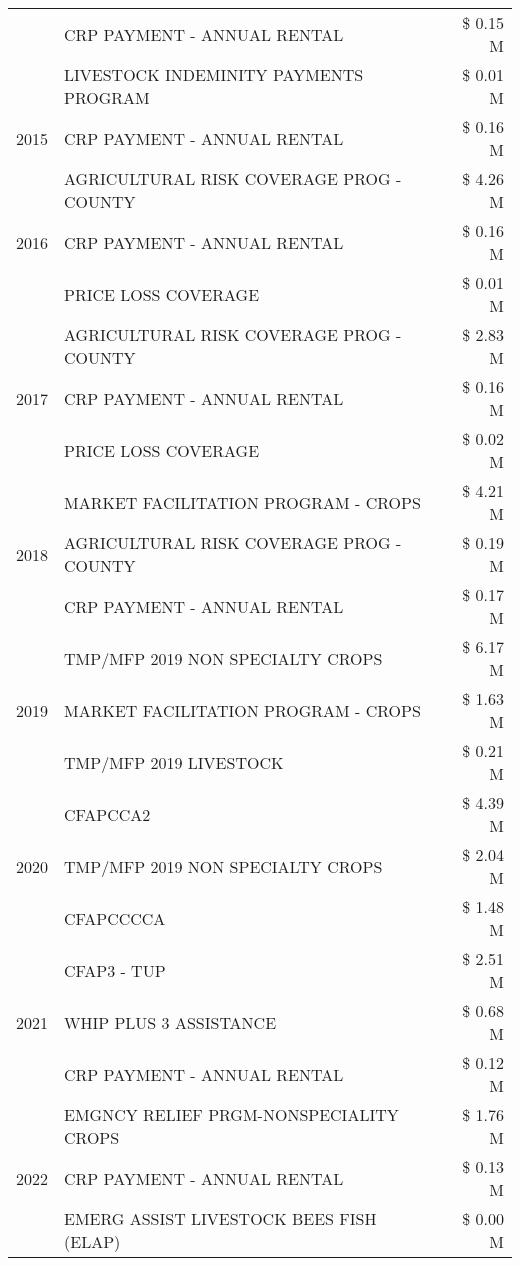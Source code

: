 \begin{tabular}{llr}
 & CRP PAYMENT - ANNUAL RENTAL & \$ 0.15 M \\
 & LIVESTOCK INDEMINITY PAYMENTS PROGRAM & \$ 0.01 M \\
\cline{1-3}
2015 & CRP PAYMENT - ANNUAL RENTAL & \$ 0.16 M \\
\cline{1-3}
\multirow[t]{3}{*}{2016} & AGRICULTURAL RISK COVERAGE PROG - COUNTY & \$ 4.26 M \\
 & CRP PAYMENT - ANNUAL RENTAL & \$ 0.16 M \\
 & PRICE LOSS COVERAGE & \$ 0.01 M \\
\cline{1-3}
\multirow[t]{3}{*}{2017} & AGRICULTURAL RISK COVERAGE PROG - COUNTY & \$ 2.83 M \\
 & CRP PAYMENT - ANNUAL RENTAL & \$ 0.16 M \\
 & PRICE LOSS COVERAGE & \$ 0.02 M \\
\cline{1-3}
\multirow[t]{3}{*}{2018} & MARKET FACILITATION PROGRAM - CROPS & \$ 4.21 M \\
 & AGRICULTURAL RISK COVERAGE PROG - COUNTY & \$ 0.19 M \\
 & CRP PAYMENT - ANNUAL RENTAL & \$ 0.17 M \\
\cline{1-3}
\multirow[t]{3}{*}{2019} & TMP/MFP 2019 NON SPECIALTY CROPS & \$ 6.17 M \\
 & MARKET FACILITATION PROGRAM - CROPS & \$ 1.63 M \\
 & TMP/MFP 2019 LIVESTOCK & \$ 0.21 M \\
\cline{1-3}
\multirow[t]{3}{*}{2020} & CFAPCCA2 & \$ 4.39 M \\
 & TMP/MFP 2019 NON SPECIALTY CROPS & \$ 2.04 M \\
 & CFAPCCCCA & \$ 1.48 M \\
\cline{1-3}
\multirow[t]{3}{*}{2021} & CFAP3 - TUP & \$ 2.51 M \\
 & WHIP PLUS 3 ASSISTANCE & \$ 0.68 M \\
 & CRP PAYMENT - ANNUAL RENTAL & \$ 0.12 M \\
\cline{1-3}
\multirow[t]{3}{*}{2022} & EMGNCY RELIEF PRGM-NONSPECIALITY CROPS & \$ 1.76 M \\
 & CRP PAYMENT - ANNUAL RENTAL & \$ 0.13 M \\
 & EMERG ASSIST LIVESTOCK BEES FISH (ELAP) & \$ 0.00 M \\
\cline{1-3}
\bottomrule
\end{tabular}
